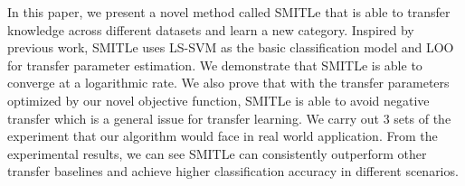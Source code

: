 In this paper, we present a novel method called SMITLe that is able to transfer knowledge across different datasets and learn a new category. Inspired by previous work, SMITLe uses LS-SVM as the basic classification model and LOO for transfer parameter estimation. We demonstrate that SMITLe is able to converge at a logarithmic rate. We also prove that with the transfer parameters optimized by our novel objective function, SMITLe is able to avoid negative transfer which is a general issue for transfer learning. 
We carry out 3 sets of the experiment that our algorithm would face in real world application. 
From the experimental results, we can see SMITLe can consistently outperform other transfer baselines and achieve higher classification accuracy in different scenarios.